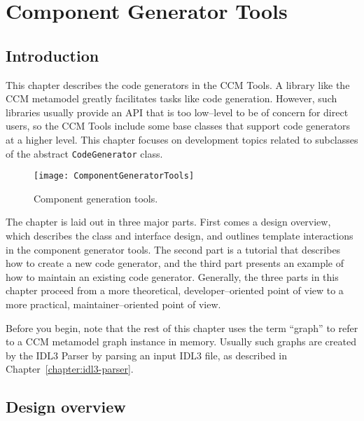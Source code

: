 \chapter{Component Generator Tools}
\label{chapter:component-generator-tools}

\section{Introduction}

This chapter describes the code generators in the CCM Tools. A library like the
CCM metamodel greatly facilitates tasks like code generation. However, such
libraries usually provide an API that is too low--level to be of concern for
direct users, so the CCM Tools include some base classes that support code
generators at a higher level. This chapter focuses on development topics related
to subclasses of the abstract {\tt CodeGenerator} class.

\begin{figure}[!htb]
\centering
\texttt{[image: ComponentGeneratorTools]}
\caption{Component generation tools.}
\label{fig:component-generator-tools}
\end{figure}

The chapter is laid out in three major parts. First comes a design overview,
which describes the class and interface design, and outlines template
interactions in the component generator tools. The second part is a tutorial
that describes how to create a new code generator, and the third part presents
an example of how to maintain an existing code generator. Generally, the three
parts in this chapter proceed from a more theoretical, developer--oriented point
of view to a more practical, maintainer--oriented point of view.

Before you begin, note that the rest of this chapter uses the term ``graph'' to
refer to a CCM metamodel graph instance in memory. Usually such graphs are
created by the IDL3 Parser by parsing an input IDL3 file, as described in
Chapter~\ref{chapter:idl3-parser}.

\section{Design overview}

